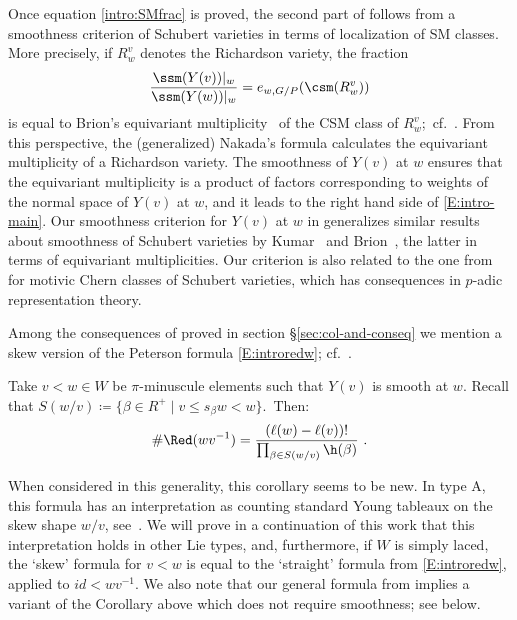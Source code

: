 Once equation \eqref{intro:SMfrac} is proved, the second part of  follows from a smoothness criterion of Schubert varieties 
in terms of localization of SM classes. {More precisely, if $R_w^v$ denotes the 
	Richardson variety, the fraction 
	\begin{equation*}\label{E:intro-eqmult} \frac{\ssm(Y(v))|_w}{\ssm(Y(w))|_w} = 
		e_{w,G/P} (\csm(R_w^{v})) \end{equation*}
	is equal to Brion's equivariant multiplicity~\cite{brion:eq-chow}
	of the CSM class of $R_w^v$;~cf.~. 
	{From this perspective, the (generalized) Nakada's formula calculates the equivariant multiplicity of a Richardson variety.}    
	The smoothness of $Y(v)$ at $w$ ensures that the equivariant multiplicity is a product of factors corresponding to weights of the normal space of $Y(v)$ at $w$, and it leads to the right hand side of
	\eqref{E:intro-main}. Our smoothness criterion for $Y(v)$ at $w$ in  generalizes similar results about smoothness of Schubert varieties by Kumar~\cite{kumar1996nil} and Brion~\cite{brion:eq-chow}, the latter in terms of equivariant multiplicities. Our criterion is also related to the one from~\cite{AMSS:motivic} for motivic Chern classes of Schubert varieties, which has consequences in $p$-adic representation theory.} 

Among the consequences of  proved in section \S\ref{sec:col-and-conseq} 
we mention a skew version of the Peterson formula \eqref{E:introredw}; cf.~.
\begin{corol} Take $v <w\in W$ be $\pi$-minuscule elements 
	such that $Y(v)$ is smooth at $w$. Recall that 
	$S(w/v)\coloneqq \{\beta\in R^+\mid v\le s_\beta w<w\}$.~Then:
	\begin{equation}\label{equ:petersonproctor-intro}
		\#\Red(wv^{-1})=\frac{(\ell(w)-\ell(v))!}{\prod_{\beta\in S(w/v)}\h(\beta)} ~\/.
	\end{equation}
\end{corol}
When considered in this generality, this corollary seems to be new. In type A, this formula has an interpretation as counting standard Young tableaux on the skew shape $w/v$, see~\cite{naruse2014schubert,morales.pak.panovaLhook,panova.petrov:hook}.
We will prove in a continuation of this work that this interpretation holds in other Lie types, and, furthermore, if $W$ is simply laced, the `skew' formula
	for $v<w$ is equal to the `straight' formula from \eqref{E:introredw}, applied to $id < wv^{-1}$.
	We also note that our general formula from  implies a variant of the Corollary above
	which does not require smoothness; see  below.


